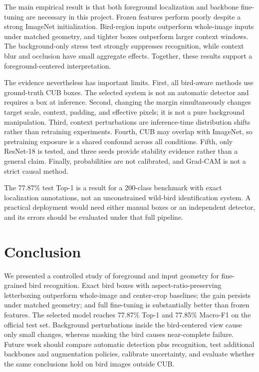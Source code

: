 \documentclass[10pt,twocolumn,letterpaper]{article}
\begin{document}
The main empirical result is that both foreground localization and backbone
fine-tuning are necessary in this project. Frozen features perform poorly
despite a strong ImageNet initialization. Bird-region inputs outperform
whole-image inputs under matched geometry, and tighter boxes outperform larger
context windows. The background-only stress test strongly suppresses
recognition, while context blur and occlusion have small aggregate effects.
Together, these results support a foreground-centered interpretation.

The evidence nevertheless has important limits. First, all bird-aware methods
use ground-truth CUB boxes. The selected system is not an automatic detector
and requires a box at inference. Second, changing the margin simultaneously
changes target scale, context, padding, and effective pixels; it is not a pure
background manipulation. Third, context perturbations are inference-time
distribution shifts rather than retraining experiments. Fourth, CUB may overlap
with ImageNet, so pretraining exposure is a shared confound across all
conditions. Fifth, only ResNet-18 is tested, and three seeds provide
stability evidence rather than a general claim. Finally, probabilities are
not calibrated, and Grad-CAM is not a strict causal method.

The 77.87\% test Top-1 is a result for a 200-class benchmark with exact
localization annotations, not an unconstrained wild-bird identification
system. A practical deployment would need either manual boxes or an
independent detector, and its errors should be evaluated under that full
pipeline.

\section{Conclusion}

We presented a controlled study of foreground and input geometry for
fine-grained bird recognition. Exact bird boxes with aspect-ratio-preserving
letterboxing outperform whole-image and center-crop baselines; the gain
persists under matched geometry; and full fine-tuning is substantially better
than frozen features. The selected model reaches 77.87\% Top-1 and 77.85\%
Macro-F1 on the official test set. Background perturbations inside the
bird-centered view cause only small changes, whereas masking the bird causes
near-complete failure. Future work should compare automatic detection plus
recognition, test additional backbones and augmentation policies, calibrate
uncertainty, and evaluate whether the same conclusions hold on bird images
outside CUB.
\end{document}
